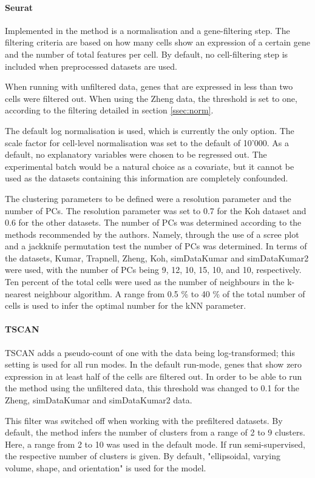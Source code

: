 \documentclass[12pt, a4paper]{article}\usepackage[]{graphicx}\usepackage[]{color}
\begin{document}
\paragraph{Seurat}
Implemented in the method is a normalisation and a gene-filtering step. The filtering criteria are based on how many cells show an expression of a certain gene and the number of total features per cell. By default, no cell-filtering step is included when preprocessed datasets are used.

When running with unfiltered data, genes that are expressed in less than two cells were filtered out. When using the Zheng data, the threshold is set to one, according to the filtering detailed in section \ref{ssec:norm}.

The default log normalisation is used, which is currently the only option. The scale factor for cell-level normalisation was set to the default of 10'000. 
As a default, no explanatory variables were chosen to be regressed out. The experimental batch would be a natural choice as a covariate, but it cannot be used as the datasets containing this information are completely confounded.

The clustering parameters to be defined were a resolution parameter and the number of PCs. The resolution parameter was set to 0.7 for the Koh dataset and 0.6 for the other datasets. 
The number of PCs was determined according to the methods recommended by the authors. Namely, through the use of a scree plot and a jackknife permutation test the number of PCs was determined. 
In terms of the datasets, Kumar, Trapnell, Zheng, Koh, simDataKumar and simDataKumar2 were used, with the number of PCs being  9, 12, 10, 15, 10, and 10, respectively.
Ten percent of the total cells were used as the number of neighbours in the k-nearest neighbour algorithm.  A range from 0.5 \% to 40 \% of the total number of cells is used to infer the optimal number for the kNN parameter.


\paragraph{TSCAN}
TSCAN adds a pseudo-count of one with the data being log-transformed; this setting is used for all run modes. 
In the default run-mode, genes that show zero expression in at least half of the cells are filtered out. In order to be able to run the method using the unfiltered data, this threshold was changed to 0.1 for the Zheng, simDataKumar and simDataKumar2 data.

This filter was switched off when working with the prefiltered datasets. By default, the method infers the number of clusters from a range of 2 to 9 clusters. Here, a range from 2 to 10 was used in the default mode. If run semi-supervised, the respective number of clusters is given. By default, "ellipsoidal, varying volume, shape, and orientation" is used for the model.
\end{document}
